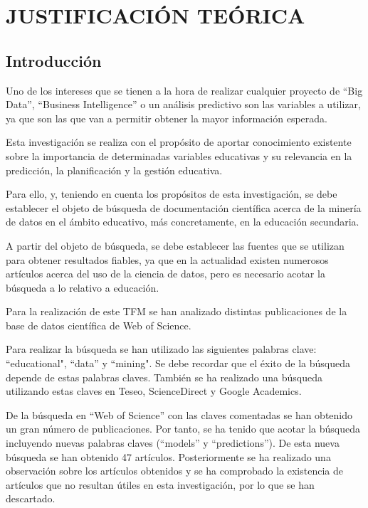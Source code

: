 \section{JUSTIFICACIÓN TEÓRICA}
\subsection{Introducción}

Uno de los intereses que se tienen a la hora de realizar cualquier proyecto de ``Big Data'', ``Business Intelligence'' o un análisis predictivo son las variables a utilizar, ya que son las que van a permitir obtener la mayor información esperada.

Esta investigación se realiza con el propósito de aportar conocimiento existente sobre la importancia de determinadas variables educativas y su relevancia en la predicción, la planificación y la gestión educativa. 

Para ello, y, teniendo en cuenta los propósitos de esta investigación, se debe establecer el objeto de búsqueda de documentación científica acerca de la minería de datos en el ámbito educativo, más concretamente, en la educación secundaria. 

A partir del objeto de búsqueda, se debe establecer las fuentes que se utilizan para obtener resultados fiables, ya que en la actualidad existen numerosos artículos acerca del uso de la ciencia de datos, pero es necesario acotar la búsqueda a lo relativo a educación.

Para la realización de este TFM se han analizado distintas publicaciones de la base de datos científica de Web of Science. 

Para realizar la búsqueda se han utilizado las siguientes palabras clave: ``educational", ``data'' y ``mining". Se debe recordar que el éxito de la búsqueda depende de estas palabras claves. También se ha realizado una búsqueda utilizando estas claves en Teseo, ScienceDirect y Google Academics.

De la búsqueda en ``Web of Science'' con las claves comentadas se han obtenido un gran número de publicaciones. Por tanto, se ha tenido que acotar la búsqueda incluyendo nuevas palabras claves (``models'' y ``predictions''). De esta nueva búsqueda se han obtenido 47 artículos. Posteriormente se ha realizado una observación sobre los artículos obtenidos y se ha comprobado la existencia de artículos que no resultan útiles en esta investigación, por lo que se han descartado.

